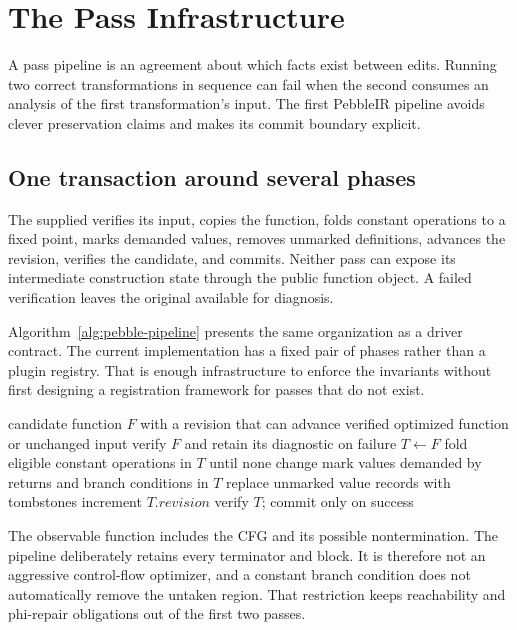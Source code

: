 \chapter{The Pass Infrastructure}
\label{ch:pebble-passes}

A pass pipeline is an agreement about which facts exist between edits.
Running two correct transformations in sequence can fail when the second consumes an analysis of the first transformation's input.
The first PebbleIR pipeline avoids clever preservation claims and makes its commit boundary explicit.

\section{One transaction around several phases}
\label{sec:pebble-pass-contract}
The supplied  verifies its input, copies the function, folds constant operations to a fixed point, marks demanded values, removes unmarked definitions, advances the revision, verifies the candidate, and commits.
Neither pass can expose its intermediate construction state through the public function object.
A failed verification leaves the original available for diagnosis.

Algorithm~\ref{alg:pebble-pipeline} presents the same organization as a driver contract.
The current implementation has a fixed pair of phases rather than a plugin registry.
That is enough infrastructure to enforce the invariants without first designing a registration framework for passes that do not exist.

\begin{algorithm}[htbp]
\caption{Running the initial optimization pipeline.}
\label{alg:pebble-pipeline}
\begin{pseudocode}
\Require candidate function $F$ with a revision that can advance
\Ensure verified optimized function or unchanged input
\State verify $F$ and retain its diagnostic on failure
\State $T\gets F$
\State fold eligible constant operations in $T$ until none change
\State mark values demanded by returns and branch conditions in $T$
\State replace unmarked value records with tombstones
\State increment $T.revision$
\State verify $T$; commit only on success
\end{pseudocode}
\end{algorithm}

The observable function includes the CFG and its possible nontermination.
The pipeline deliberately retains every terminator and block.
It is therefore not an aggressive control-flow optimizer, and a constant branch condition does not automatically remove the untaken region.
That restriction keeps reachability and phi-repair obligations out of the first two passes.


